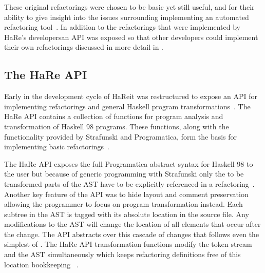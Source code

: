 These original refactorings were chosen to be basic yet still useful, and for their ability to give insight into the issues surrounding implementing an automated refactoring tool~\citep{huiqingThesis}. In addition to the refactorings that were implemented by HaRe's developers\DIFaddbegin \DIFadd{, }\DIFaddend an API was exposed so that other developers could implement their own refactorings \DIFdelbegin {}\DIFdelend \DIFaddbegin {}\DIFaddend discussed in more detail in \DIFdelbegin {}\DIFdelend \DIFaddbegin {}\DIFaddend .


\subsection{The HaRe API}\label{hareApi}

Early in the development cycle of HaRe\DIFaddbegin \DIFadd{, }\DIFaddend it was restructured to expose an API for implementing refactorings and general Haskell program transformations~\citep{hareApi}. The HaRe API contains a collection of functions for program analysis and transformation of Haskell 98 programs. These functions, along with the functionality provided by Strafunski and Programatica, form the basis for implementing basic refactorings~\citep{hareApi}.

The HaRe API exposes the full Programatica abstract syntax for Haskell 98 to the user but because of generic programming with Strafunski only the to be transformed parts of the AST have to be explicitly referenced in a refactoring~\citep{hareApi}. Another key feature of the API was to hide layout and comment preservation allowing the programmer to focus on program transformation instead. Each subtree in the AST is tagged with its absolute location in the source file. Any modifications to the AST will change the location of all elements that occur after the change. The API abstracts over this cascade of changes that follows even the simplest of \DIFdelbegin {}\DIFdelend \DIFaddbegin {}\DIFaddend . The HaRe API transformation functions modify the token stream and the AST simultaneously which keeps refactoring definitions free of this location bookkeeping ~\citep{hareApi}. \DIFaddbegin {}\DIFaddend 

